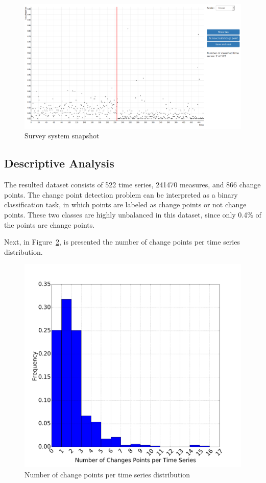 \begin{figure}[H]
    \centering
    \includegraphics[width=\linewidth]{./figures/dataset/cp/survey_system.png}
    \caption{Survey system snapshot}
    \label{fig:survey_system}
\end{figure}%

\subsection{Descriptive Analysis}

The resulted dataset consists of 522 time series, 241470 measures, and 866 change points. The change point detection problem can be interpreted as a binary classification task, in which points are labeled as change points or not change points. These two classes are highly unbalanced in this dataset, since only 0.4\% of the points are change points. 

Next, in Figure~\ref{fig:cps_per_ts}, is presented the number of change points per time series distribution.

\begin{figure}[H]
    \centering
    \includegraphics[width=0.6\linewidth]{./figures/dataset/cp/cps_per_ts.png}
    \caption{Number of change points per time series distribution}
    \label{fig:cps_per_ts}
\end{figure}%


